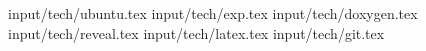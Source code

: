 
\newpage

\newpage
 {input/tech/ubuntu.tex}
\newpage
 {input/tech/exp.tex}
\newpage
 {input/tech/doxygen.tex}
\newpage
 {input/tech/reveal.tex}
\newpage
 {input/tech/latex.tex}
\newpage
 {input/tech/git.tex}




